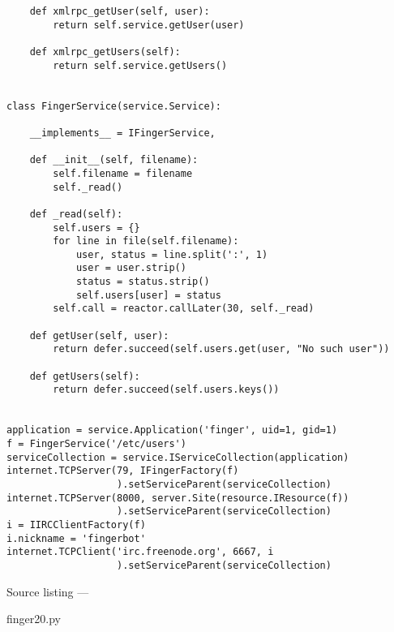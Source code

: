 \begin{verbatim}
    def xmlrpc_getUser(self, user):
        return self.service.getUser(user)

    def xmlrpc_getUsers(self):
        return self.service.getUsers()


class FingerService(service.Service):

    __implements__ = IFingerService,

    def __init__(self, filename):
        self.filename = filename
        self._read()

    def _read(self):
        self.users = {}
        for line in file(self.filename):
            user, status = line.split(':', 1)
            user = user.strip()
            status = status.strip()
            self.users[user] = status
        self.call = reactor.callLater(30, self._read)

    def getUser(self, user):
        return defer.succeed(self.users.get(user, "No such user"))

    def getUsers(self):
        return defer.succeed(self.users.keys())


application = service.Application('finger', uid=1, gid=1)
f = FingerService('/etc/users')
serviceCollection = service.IServiceCollection(application)
internet.TCPServer(79, IFingerFactory(f)
                   ).setServiceParent(serviceCollection)
internet.TCPServer(8000, server.Site(resource.IResource(f))
                   ).setServiceParent(serviceCollection)
i = IIRCClientFactory(f)
i.nickname = 'fingerbot'
internet.TCPClient('irc.freenode.org', 6667, i
                   ).setServiceParent(serviceCollection)
\end{verbatim}\parbox[b]{\linewidth}{\begin{center}Source listing --- \begin{em}finger20.py\end{em}\end{center}}